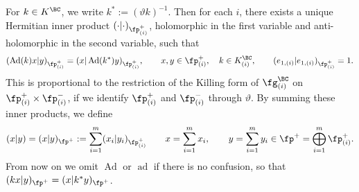 For $k\in K^\BC$, we write $k^*:=(\vartheta k)^{-1}$.
Then for each $i$, there exists a unique Hermitian inner product $(\cdot|\cdot)_{\fp^+_{(i)}}$,
holomorphic in the first variable and anti-holomorphic in the second variable, such that
\begin{gather*}
(\operatorname{Ad}(k)x|y)_{\fp^+_{(i)}} =(x|\operatorname{Ad}(k^*)y)_{\fp^+_{(i)}}, \qquad x,y\in\fp^+_{(i)},\quad k\in K^\BC_{(i)},\qquad
(e_{1,(i)}|e_{1,(i)})_{\fp^+_{(i)}} =1.
\end{gather*}
This is proportional to the restriction of the Killing form of $\fg_{(i)}^\BC$ on $\fp^+_{(i)}\times \fp^-_{(i)}$,
if we identify $\fp^+_{(i)}$ and $\fp^-_{(i)}$ through $\vartheta$. By summing these inner products, we define
\begin{gather}\label{innerprod}
(x|y)=(x|y)_{\fp^+}:=\sum_{i=1}^m (x_i|y_i)_{\fp^+_{(i)}} \qquad
 x=\sum_{i=1}^m x_i, \qquad y=\sum_{i=1}^m y_i\in\fp^+=\bigoplus_{i=1}^m\fp^+_{(i)} .
\end{gather}
From now on we omit $\operatorname{Ad}$ or $\operatorname{ad}$ if there is no confusion, so that $(kx|y)_{\fp^+}=(x|k^*y)_{\fp^+}$.

